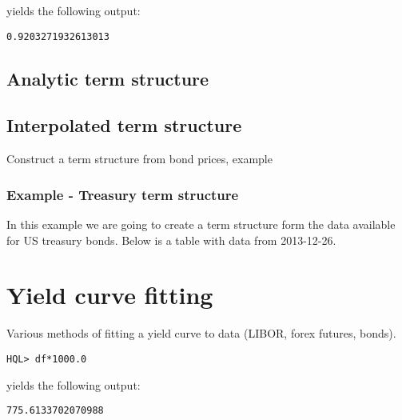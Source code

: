 \documentclass[11pt,a4paper]{article}
\numberwithin{equation}{section}
\begin{document}
yields the following output:
\FrameSep

\begin{lstlisting}[style=Output]
0.9203271932613013
\end{lstlisting}

\subsection{Analytic term structure}

\subsection{Interpolated term structure}
Construct a term structure from bond prices, example

\subsubsection{Example - Treasury term structure}
In this example we are going to create a term structure form the data available for
US treasury bonds. Below is a table with data from 2013-12-26.


\section{Yield curve fitting}
Various methods of fitting a yield curve to data (LIBOR, forex futures, bonds).

\begin{lstlisting}
HQL> df*1000.0
\end{lstlisting}
yields the following output:
\FrameSep
\begin{lstlisting}[style=Output]
775.6133702070988
\end{lstlisting}
\end{document}
